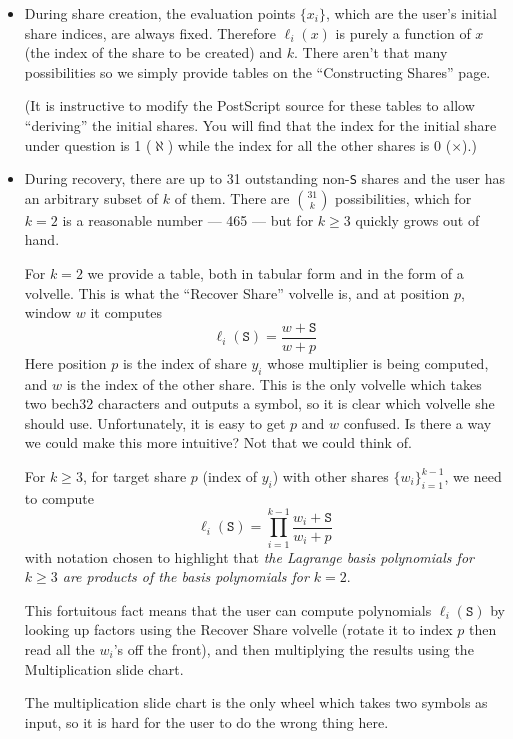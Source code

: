 \documentclass[letterpaper]{article}
\theoremstyle{xxx}
\theoremstyle{evil}
\theoremstyle{yyy}
\theoremstyle{plain}
\theoremstyle{zzz}
\begin{document}
\begin{itemize}
\item During share creation, the evaluation points $\{x_i\}$, which are the
user's initial share indices, are always fixed. Therefore $\ell_i(x)$ is purely
a function of $x$ (the index of the share to be created) and $k$. There aren't
that many possibilities so we simply provide tables on the ``Constructing Shares''
page.

(It is instructive to modify the PostScript source for these tables to allow
``deriving'' the initial shares. You will find that the index for the initial
share under question is 1 ($\aleph$) while the index for all the other shares
is 0 ($\times$).)

\item During recovery, there are up to 31 outstanding non-\texttt{S} shares and
the user has an arbitrary subset of $k$ of them. There are $\binom{31}k$
possibilities, which for $k=2$ is a reasonable number --- 465 --- but for
$k\geq3$ quickly grows out of hand.

For $k = 2$ we provide a table, both in tabular form and in the form of a volvelle.
This is what the ``Recover Share'' volvelle is, and at position $p$, window $w$ it
computes
\[ \ell_i(\texttt{S}) = \frac{w + \texttt{S}}{w + p} \]
Here position $p$ is the index of share $y_i$ whose multiplier is being computed,
and $w$ is the index of the other share. This is the only volvelle which takes two
bech32 characters and outputs a symbol, so it is clear which volvelle she should
use. Unfortunately, it is easy to get $p$ and $w$ confused. Is there a way we
could make this more intuitive? Not that we could think of.

For $k \geq 3$, for target share $p$ (index of $y_i$) with other shares
$\{w_i\}_{i=1}^{k-1}$, we need to compute
\[ \ell_i(\texttt{S}) = \prod_{i=1}^{k-1} \frac{w_i + \texttt{S}}{w_i + p} \]
with notation chosen to highlight that \emph{the Lagrange basis polynomials for
$k\geq3$ are products of the basis polynomials for $k=2$}.

This fortuitous fact means that the user can compute polynomials $\ell_i(\texttt{S})$
by looking up factors using the Recover Share volvelle (rotate it to index $p$ then
read all the $w_i$'s off the front), and then multiplying the
results using the Multiplication slide chart.

The multiplication slide chart is the only wheel which takes two symbols as input,
so it is hard for the user to do the wrong thing here.
\end{itemize}
\end{document}
